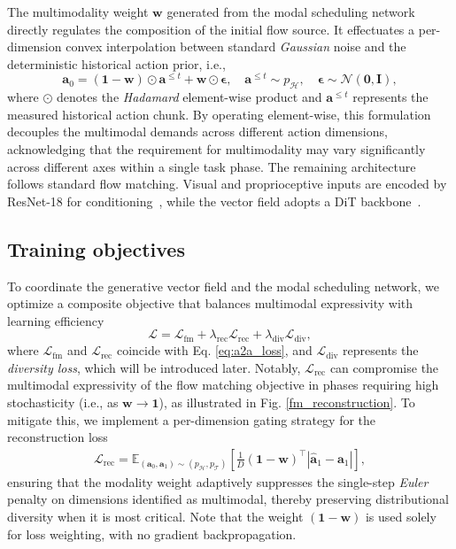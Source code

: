 The multimodality weight $\mathbf{w}$ generated from the modal scheduling network directly regulates the composition of the initial flow source. It effectuates a per-dimension convex interpolation between standard \textit{Gaussian} noise and the deterministic historical action prior, i.e.,
\begin{equation}
    \mathbf{a}_0 = (\mathbf{1} - \mathbf{w}) \odot \mathbf{a}^{\leq t} + \mathbf{w} \odot \boldsymbol{\epsilon}, \quad \mathbf{a}^{\leq t}\sim p_\mathcal{H}, \quad \boldsymbol{\epsilon} \sim \mathcal{N}(\mathbf{0}, \mathbf{I}), 
    \label{eq:adaptive_source}
\end{equation}
where $\odot$ denotes the \textit{Hadamard} element-wise product and $\mathbf{a}^{\leq t}$ represents the measured historical action chunk. By operating element-wise, this formulation decouples the multimodal demands across different action dimensions, acknowledging that the requirement for multimodality may vary significantly across different axes within a single task phase. The remaining architecture follows standard flow matching. Visual and proprioceptive inputs are encoded by ResNet-18 for conditioning~\citep{jia2026action}, while the vector field adopts a DiT backbone~\citep{Peebles_2023_ICCV}. 

\subsection{Training objectives}

To coordinate the generative vector field and the modal scheduling network, we optimize a composite objective that balances multimodal expressivity with learning efficiency
\begin{equation}
    \mathcal{L} = \mathcal{L}_{\mathrm{fm}}
               + \lambda_{\mathrm{rec}} \mathcal{L}_{\mathrm{rec}}
                 + \lambda_{\mathrm{div}}\mathcal{L}_{\mathrm{div}},
    \label{eq:total_loss}
\end{equation}
where $\mathcal{L}_{\mathrm{fm}}$ and $\mathcal{L}_{\mathrm{rec}}$ coincide with Eq. \eqref{eq:a2a_loss}, and $\mathcal{L}_{\mathrm{div}}$ represents the \textit{diversity loss}, which will be introduced later. Notably, $\mathcal{L}_{\mathrm{rec}}$ can compromise the multimodal expressivity of the flow matching objective in phases requiring high stochasticity (i.e., as $\mathbf{w} \to \mathbf{1}$), as illustrated in Fig. \ref{fm_reconstruction}. To mitigate this, we implement a per-dimension gating strategy for the reconstruction loss
\begin{equation}
\begin{aligned}
    \mathcal{L}_{\mathrm{rec}} =  \mathbb{E}_{(\mathbf{a}_0, \mathbf{a}_1) \sim(p_\mathcal{H}, p_\mathcal{T})} [\frac{1}{D}(\mathbf{1} - \mathbf{w})^\top | \hat{\mathbf{a}}_1 - \mathbf{a}_1 |],
\end{aligned}
\end{equation}
ensuring that the modality weight adaptively suppresses the single-step \textit{Euler} penalty on dimensions identified as multimodal, thereby preserving distributional diversity when it is most critical. Note that the weight $(\mathbf{1} - \mathbf{w})$ is used solely for loss weighting, with no gradient backpropagation. 

